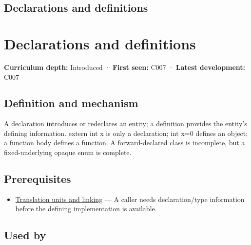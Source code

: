 \hypertarget{appendix-2e4d494c2d94}{}
\section*{Declarations and definitions}
\chapter{Declarations and definitions}\label{appendix-2e4d494c2d94-declarations-and-definitions}

\textbf{Curriculum depth:} Introduced · \textbf{First seen:} C007 · \textbf{Latest development:} C007

\section{Definition and mechanism}\label{appendix-2e4d494c2d94-definition-and-mechanism}

A declaration introduces or redeclares an entity; a definition provides the entity's defining information. extern int x is only a declaration; int x=0 defines an object; a function body defines a function. A forward-declared class is incomplete, but a fixed-underlying opaque enum is complete.

\section{Prerequisites}\label{appendix-2e4d494c2d94-prerequisites}

\begin{itemize}
\tightlist
\item
  \hyperref[appendix-806686359e1b]{Translation units and linking} --- A caller needs declaration/type information before the defining implementation is available.
\end{itemize}

\section{Used by}\label{appendix-2e4d494c2d94-used-by}

